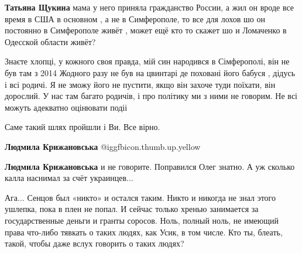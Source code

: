 \begin{itemize}
\begin{itemize}
\textbf{Татьяна Щукина} мама у него приняла гражданство России, а жил он вроде все время в США в основном , а не в Симферополе, то все для лохов шо он постоянно в Симферополе живёт , может ещё кто то скажет шо и Ломаченко в Одесской области живёт?


Знаєте хлопці, у кожного своя правда, мій син народився в Сімферополі, він не
був там з 2014 Жодного разу не був на цвинтарі де поховані його бабуся , дідусь
і всі родичі. Я не зможу його не пустити, якщо він захоче туди поїхати, він
дорослий. У нас там багато родичів, і про політику ми з ними не говорим. Не всі
можуть адекватно оцінювати подіі

\end{itemize} %

Саме такий шлях пройшли і Ви. Все вірно.

\begin{itemize} %
\textbf{Людмила Крижановська}  @igg{fbicon.thumb.up.yellow} 

\textbf{Людмила Крижановська} и не говорите. Поправился Олег знатно. А уж сколько калла наснимал за счёт украинцев...


Ага... Сенцов был «никто» и остался таким. Никто и никогда не знал этого ушлепка,
пока в плен не попал. И сейчас только хренью занимается за государственные
деньги и гранты соросов. Ноль, полный ноль, не имеющий права что-либо тявкать о
таких людях, как Усик, в том числе. Кто ты, блеать, такой, чтобы даже вслух
говорить о таких людях?

\end{itemize} %

\end{itemize} %
